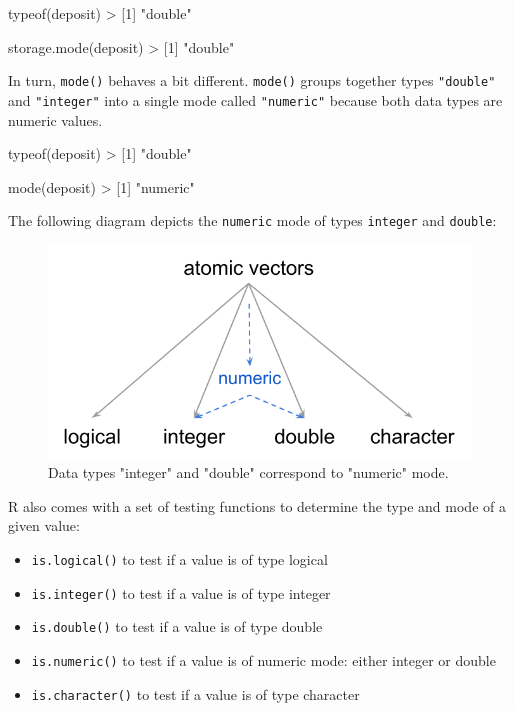 \documentclass[
]{book}
\newenvironment{Shaded}{\begin{snugshade}}{\end{snugshade}}
\newcommand{\DecValTok}[1]{\textcolor[rgb]{0.00,0.00,0.81}{#1}}
\newcommand{\FunctionTok}[1]{\textcolor[rgb]{0.00,0.00,0.00}{#1}}
\newcommand{\NormalTok}[1]{#1}
\newcommand{\SpecialCharTok}[1]{\textcolor[rgb]{0.00,0.00,0.00}{#1}}
\newcommand{\StringTok}[1]{\textcolor[rgb]{0.31,0.60,0.02}{#1}}
\begin{document}
\begin{Shaded}
\begin{Highlighting}[]
\FunctionTok{typeof}\NormalTok{(deposit)}
\SpecialCharTok{\textgreater{}}\NormalTok{ [}\DecValTok{1}\NormalTok{] }\StringTok{"double"}

\FunctionTok{storage.mode}\NormalTok{(deposit)}
\SpecialCharTok{\textgreater{}}\NormalTok{ [}\DecValTok{1}\NormalTok{] }\StringTok{"double"}
\end{Highlighting}
\end{Shaded}

In turn, \texttt{mode()} behaves a bit different. \texttt{mode()} groups together types
\texttt{"double"} and \texttt{"integer"} into a single mode called \texttt{"numeric"} because both
data types are numeric values.

\begin{Shaded}
\begin{Highlighting}[]
\FunctionTok{typeof}\NormalTok{(deposit)}
\SpecialCharTok{\textgreater{}}\NormalTok{ [}\DecValTok{1}\NormalTok{] }\StringTok{"double"}

\FunctionTok{mode}\NormalTok{(deposit)}
\SpecialCharTok{\textgreater{}}\NormalTok{ [}\DecValTok{1}\NormalTok{] }\StringTok{"numeric"}
\end{Highlighting}
\end{Shaded}

The following diagram depicts the \texttt{numeric} mode of types \texttt{integer} and
\texttt{double}:

\begin{figure}

{\centering \includegraphics[width=0.55\linewidth]{images/objects/obj-vector-atomic-modes} 

}

\caption{Data types "integer" and "double" correspond to "numeric" mode.}\label{fig:unnamed-chunk-24}
\end{figure}

R also comes with a set of testing functions to determine the type and mode of
a given value:

\begin{itemize}
\item
  \texttt{is.logical()} to test if a value is of type logical
\item
  \texttt{is.integer()} to test if a value is of type integer
\item
  \texttt{is.double()} to test if a value is of type double
\item
  \texttt{is.numeric()} to test if a value is of numeric mode: either integer or double
\item
  \texttt{is.character()} to test if a value is of type character
\end{itemize}
\end{document}
